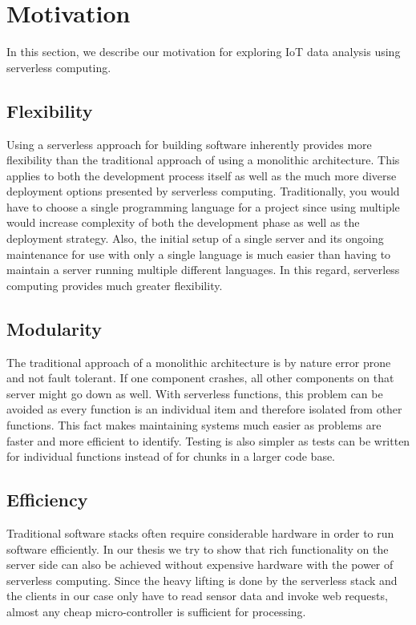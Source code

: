 \chapter{Motivation}
\label{sec:motivation}

In this section, we describe our motivation for exploring IoT data analysis using serverless
computing.

\section{Flexibility}

Using a serverless approach for building software inherently provides more flexibility than the
traditional approach of using a monolithic architecture. This applies to both the development
process itself as well as the much more diverse deployment options presented by serverless
computing. Traditionally, you would have to choose a single programming language for a project since
using multiple would increase complexity of both the development phase as well as the deployment
strategy. Also, the initial setup of a single server and its ongoing maintenance for use with only a
single language is much easier than having to maintain a server running multiple different
languages. In this regard, serverless computing provides much greater flexibility.

\section{Modularity}

The traditional approach of a monolithic architecture is by nature error prone and not fault
tolerant. If one component crashes, all other components on that server might go down as well. With
serverless functions, this problem can be avoided as every function is an individual item and
therefore isolated from other functions. This fact makes maintaining systems much easier as problems
are faster and more efficient to identify. Testing is also simpler as tests can be written for
individual functions instead of for chunks in a larger code base.

\section{Efficiency}

Traditional software stacks often require considerable hardware in order to run software
efficiently. In our thesis we try to show that rich functionality on the server side can also be
achieved without expensive hardware with the power of serverless computing. Since the heavy lifting
is done by the serverless stack and the clients in our case only have to read sensor data and invoke
web requests, almost any cheap micro-controller is sufficient for processing.

